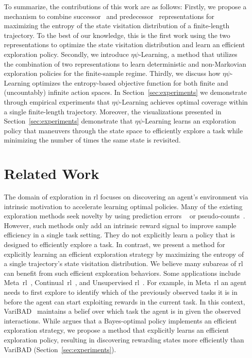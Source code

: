 \documentclass{article}
\theoremstyle{plain}
\theoremstyle{definition}
\theoremstyle{remark}
\newcommand{\alg}{$\eta$$\psi$-Learning}
\begin{document}
To summarize, the contributions of this work are as follows:
Firstly, we propose a mechanism to combine successor~\citep{dayan1993improving} and predecessor~\citep{vanhasselt2021expectedeligibilitytraces} representations for maximizing the entropy of the state visitation distribution of a finite-length trajectory. 
To the best of our knowledge, this is the first work using the two representations to optimize the state visitation distribution and learn an efficient exploration policy. 
Secondly, we introduce \alg{}, a method that utilizes the combination of two representations to learn deterministic and non-Markovian exploration policies for the finite-sample regime.
Thirdly, we discuss how \alg{} optimizes the entropy-based objective function for both finite and (uncountably) infinite action spaces. 
In Section~\ref{sec:experiments} we demonstrate through empirical experiments that \alg{} achieves optimal coverage within a single finite-length trajectory. 
Moreover, the visualizations presented in Section~\ref{sec:experiments} demonstrate that \alg{} learns an exploration policy that maneuvers through the state space to efficiently explore a task while minimizing the number of times the same state is revisited.


\section{Related Work}
The domain of exploration in \gls{rl} focuses on discovering an agent's environment via intrinsic motivation to accelerate learning optimal policies.
Many of the existing exploration methods seek novelty by using prediction errors
~\cite{pathak2017icm, burda2019exploration,sekar2020planning,stadie2015incentivizing} or pseudo-counts~\cite{strehl2008analysis,bellemare2016cts,machado2020count}. 
However, such methods only add an intrinsic reward signal to improve sample efficiency in a single task setting.
They do not explicitly learn a policy that is designed to efficiently explore a task.
In contrast, we present a method for explicitly learning an efficient exploration strategy by maximizing the entropy of a single trajectory's state visitation distribution. 
We believe many subareas of \gls{rl} can benefit from such efficient exploration behaviors.
Some applications include Meta~\gls{rl}~\cite{finn2017model, zintgraf2019varibad, rakelly2019efficient, liu2021decoupling}, Continual~\gls{rl}~\cite{khetarpal2020towards,lehnert2017advantages}, and Unsupervised \gls{rl}~\cite{laskin2021urlb}. 
For example, in Meta~\gls{rl} an agent needs to first explore to identify which of the previously observed tasks it is in before the agent can start exploiting rewards in the current task.
In this context, VariBAD~\cite{zintgraf2019varibad} maintains a belief over which task the agent is in given the observed interactions.
While \citeauthor{zintgraf2019varibad} argues that a Bayes-optimal policy implements an efficient exploration strategy, we propose a method that explicitly learns an efficient exploration policy, resulting in discovering rewarding states more efficiently than VariBAD (Section~\ref{sec:experiments}).
\end{document}

